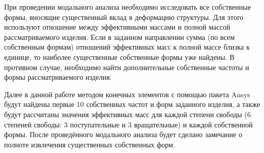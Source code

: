 При проведении модального анализа необходимо исследовать все собственные формы, вносящие существенный вклад в деформацию структуры. Для этого используют отношение между эффективными массами и полной массой рассматриваемого изделия. Если в заданном направлении сумма (по всем собственным формам) отношений эффективных масс к полной массе близка к единице, то наиболее существенные собственные формы уже найдены. В противном случае, необходимо найти дополнительные собственные частоты и формы рассматриваемого изделия.

Далее в данной работе методом конечных элементов с помощью пакета Ansys \cite{fea_in_engin} будут найдены первые 10 собственных частот и форм заданного изделия, а также будут рассчитаны значения эффективных масс для каждой степени свободы (6 степеней свободы: 3 поступательные и 3 вращательные) и каждой собственной формы. После проведённого модального анализа будет сделано замечание о полноте извлечения существенных собственных форм. 

